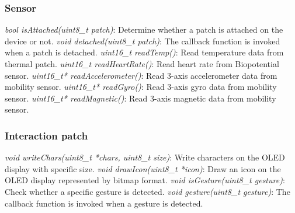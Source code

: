 \subsubsection{Sensor}
\textit{bool isAttached(uint8\_t patch)}: Determine whether a patch is attached on the device or not.
\vspace{10pt}
\newline
\textit{void detached(uint8\_t patch)}: The callback function is invoked when a patch is detached.
\vspace{10pt}
\newline
\textit{uint16\_t readTemp()}: Read temperature data from thermal patch.
\vspace{10pt}
\newline
\textit{uint16\_t readHeartRate()}: Read heart rate from Biopotential sensor.
\vspace{10pt}
\newline
\textit{uint16\_t* readAccelerometer()}: Read 3-axis accelerometer data from mobility sensor.
\vspace{10pt}
\newline
\textit{uint16\_t* readGyro()}: Read 3-axis gyro data from mobility sensor.
\vspace{10pt}
\newline
\textit{uint16\_t* readMagnetic()}: Read 3-axis magnetic data from mobility sensor.
\vspace{10pt}
\newline

\subsubsection{Interaction patch}
\textit{void writeChars(uint8\_t *chars, uint8\_t size)}: Write characters on the OLED display with specific size.
\vspace{10pt}
\newline
\textit{void drawIcon(uint8\_t *icon)}: Draw an icon on the OLED display represented by bitmap format.
\vspace{10pt}
\newline
\textit{void isGesture(uint8\_t gesture)}: Check whether a specific gesture is detected.
\vspace{10pt}
\newline
\textit{void gesture(uint8\_t gesture)}: The callback function is invoked when a gesture is detected.
\vspace{10pt}
\newline

